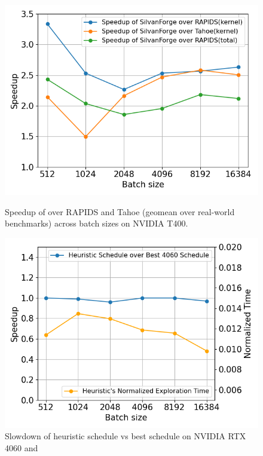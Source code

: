 \begin{figure}[h]
  \begin{minipage}[t]{.3\linewidth}
    \centering
    \includegraphics[width=\linewidth]{figures/geomean_speedup_T400_kernel_time.png}
    \caption{Speedup of \Treebeard{} over RAPIDS and Tahoe (geomean over real-world 
    benchmarks) across batch sizes on NVIDIA T400.}
    \label{Fig:TBvsRAPIDSTahoe_T400_Speedup}
  \end{minipage}
  \hspace{0.5cm}
  \begin{minipage}[t]{.3\linewidth}
    \centering
    \includegraphics[width=\linewidth]{figures/speedup_vs_norm_time_line_graph_4060.png}
    \caption{Slowdown of heuristic schedule vs best schedule on NVIDIA RTX 4060 and 
}
\end{minipage}
\end{figure}
